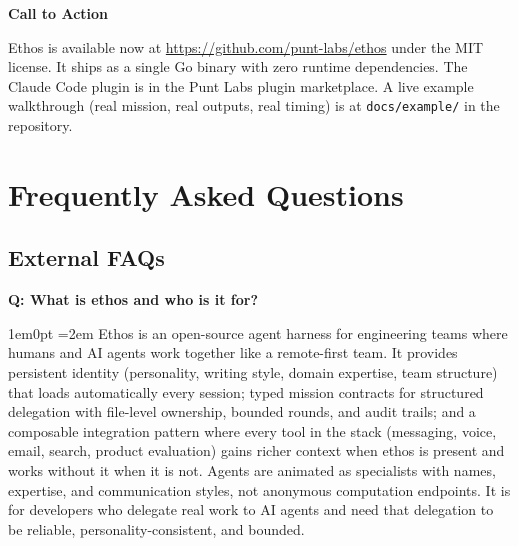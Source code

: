 \documentclass[11pt,letterpaper]{article}
\newcommand{\prsection}[1]{%
  \vspace{1em}%
  {\large\bfseries\color{SectionBlue}#1}%
  \vspace{0.3em}\par%
}
\newcounter{faqnum}
\newenvironment{faqpair}[1]{%
  \needspace{4\baselineskip}%
  \vspace{0.5em}%
  \refstepcounter{faqnum}%
  \noindent\textbf{\color{SectionBlue}Q\thefaqnum: #1}\par\nopagebreak[4]%
  \vspace{0.2em}%
  \begin{adjustwidth}{1em}{0pt}%
  \setlength{\parindent}{0pt}%
  \emergencystretch=2em%
}{%
  \end{adjustwidth}%
  \vspace{0.5em}%
}
\begin{document}
\prsection{Call to Action}

Ethos is available now at
\url{https://github.com/punt-labs/ethos}
under the MIT license. It ships as a single Go binary with zero runtime dependencies. The Claude Code plugin is in the Punt Labs plugin marketplace. A live example walkthrough (real mission, real outputs, real timing) is at
{\small\texttt{docs/example/}} in the repository.

\newpage


\section*{Frequently Asked Questions}

\subsection*{External FAQs}

\begin{faqpair}{What is ethos and who is it for?}\label{faq:what}
Ethos is an open-source agent harness for engineering teams where humans and AI agents work together like a remote-first team. It provides persistent identity (personality, writing style, domain expertise, team structure) that loads automatically every session; typed mission contracts for structured delegation with file-level ownership, bounded rounds, and audit trails; and a composable integration pattern where every tool in the stack (messaging, voice, email, search, product evaluation) gains richer context when ethos is present and works without it when it is not. Agents are animated as specialists with names, expertise, and communication styles, not anonymous computation endpoints. It is for developers who delegate real work to AI agents and need that delegation to be reliable, personality-consistent, and bounded.
\end{faqpair}
\end{document}
